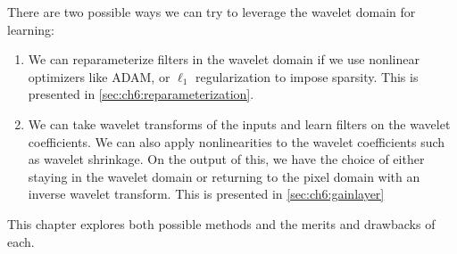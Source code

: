 There are two possible ways we can try to leverage the wavelet domain for
learning: 

\begin{enumerate}
  \item We can reparameterize filters in the wavelet domain if we use nonlinear
  optimizers like ADAM, or $\ell_1$ regularization to impose sparsity. This is
  presented in \autoref{sec:ch6:reparameterization}.
  \item We can take wavelet transforms of the inputs and learn filters on the
    wavelet coefficients. We can also apply nonlinearities to the wavelet coefficients
    such as wavelet shrinkage. On the output of this, we have the choice of either
    staying in the wavelet domain or returning to the pixel domain with an
    inverse wavelet transform. This is presented in \autoref{sec:ch6:gainlayer}
\end{enumerate}

This chapter explores both possible methods and the merits and drawbacks of
each.

